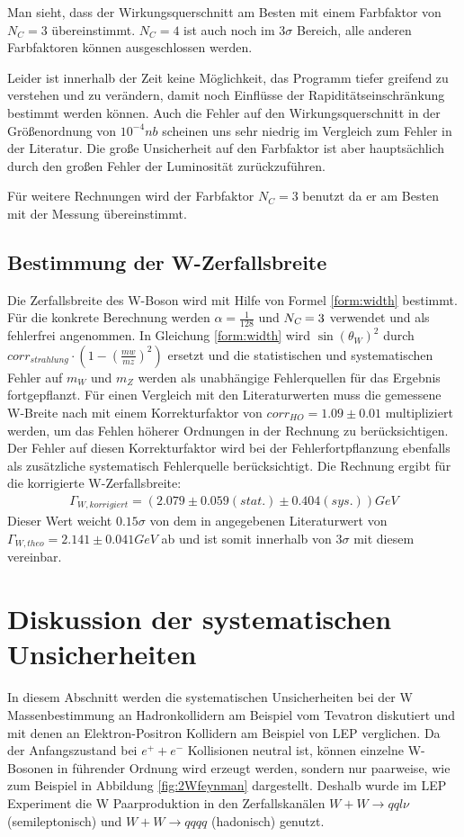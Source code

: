 \documentclass[a4paper,12pt]{article}
\begin{document}
Man sieht, dass der Wirkungsquerschnitt am Besten mit einem Farbfaktor von $N_C = 3$ übereinstimmt.
$N_C = 4$ ist auch noch im $3σ$ Bereich, alle anderen Farbfaktoren können ausgeschlossen werden.

Leider ist innerhalb der Zeit keine Möglichkeit, das Programm tiefer greifend zu verstehen und zu
verändern, damit noch Einflüsse der Rapiditätseinschränkung bestimmt werden können. Auch die Fehler
auf den Wirkungsquerschnitt in der Größenordnung von $10^{-4}\si{nb}$ scheinen uns sehr niedrig im
Vergleich zum Fehler in der Literatur.
Die große Unsicherheit auf den Farbfaktor ist aber hauptsächlich durch den großen Fehler der
Luminosität zurückzuführen.

Für weitere Rechnungen wird der Farbfaktor $N_C = 3$ benutzt da er am Besten mit der Messung
übereinstimmt.

\subsection{Bestimmung der W-Zerfallsbreite}
Die Zerfallsbreite des W-Boson wird mit Hilfe von Formel \ref{form:width} bestimmt. Für die konkrete Berechnung
werden $\alpha = \frac{1}{128}$ und $N_{\textsl{C}}=3$ verwendet und als fehlerfrei angenommen. In Gleichung \ref{form:width}
wird $\sin(\theta_{W})^{2} $
 durch $corr_{strahlung}\cdot(1-(\frac{mw}{mz})^{2})$ ersetzt und die statistischen und
systematischen Fehler auf $m_{W}$ und $m_{Z}$ werden als unabhängige Fehlerquellen für das Ergebnis fortgepflanzt. Für 
einen Vergleich mit den Literaturwerten muss die gemessene W-Breite nach \cite{versuchsanleitung} mit einem Korrekturfaktor
von $corr_{HO}=1.09 \pm 0.01$ multipliziert werden, um das Fehlen höherer Ordnungen in der Rechnung zu berücksichtigen. Der
Fehler auf diesen Korrekturfaktor wird bei der Fehlerfortpflanzung ebenfalls als zusätzliche systematisch Fehlerquelle
berücksichtigt. Die Rechnung ergibt für die korrigierte W-Zerfallsbreite:
\begin{align*}
	Γ_{W,korrigiert} = ( 2.079 ± 0.059 (stat.) ± 0.404(sys.)) \si{GeV}
\end{align*}
Dieser Wert weicht $0.15\sigma$ von dem in \cite{versuchsanleitung} angegebenen Literaturwert von
$Γ_{W,theo} = 2.141 \pm 0.041\si{GeV}$
ab und ist somit innerhalb von $3\sigma$ mit diesem vereinbar.

\newpage
\section{Diskussion der systematischen Unsicherheiten}
In diesem Abschnitt werden die systematischen Unsicherheiten bei der W Massenbestimmung an Hadronkollidern am Beispiel vom Tevatron diskutiert
und mit denen an Elektron-Positron Kollidern am Beispiel von LEP verglichen. Da der Anfangszustand bei $e^{+}+e^{-}$ Kollisionen neutral ist, können einzelne W-Bosonen
in führender Ordnung wird erzeugt werden, sondern nur paarweise, wie zum Beispiel in Abbildung \ref{fig:2Wfeynman} dargestellt. Deshalb wurde im LEP Experiment die W Paarproduktion in den \cite{Achard:2005qy}
Zerfallskanälen $W+W \rightarrow qql\nu$ (semileptonisch) und $W+W \rightarrow qqqq$ (hadonisch) genutzt.
\end{document}
